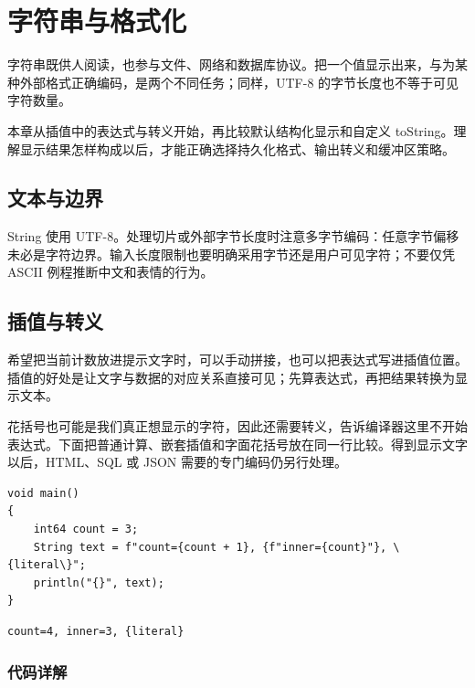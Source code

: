 \chapter{字符串与格式化}
\label{ch:12}

字符串既供人阅读，也参与文件、网络和数据库协议。把一个值显示出来，与为某种外部格式正确编码，是两个不同任务；同样，UTF-8 的字节长度也不等于可见字符数量。

本章从插值中的表达式与转义开始，再比较默认结构化显示和自定义 toString。理解显示结果怎样构成以后，才能正确选择持久化格式、输出转义和缓冲区策略。

\section{文本与边界}

String 使用 UTF-8。处理切片或外部字节长度时注意多字节编码：任意字节偏移未必是字符边界。输入长度限制也要明确采用字节还是用户可见字符；不要仅凭 ASCII 例程推断中文和表情的行为。

\section{插值与转义}

希望把当前计数放进提示文字时，可以手动拼接，也可以把表达式写进插值位置。插值的好处是让文字与数据的对应关系直接可见；先算表达式，再把结果转换为显示文本。

花括号也可能是我们真正想显示的字符，因此还需要转义，告诉编译器这里不开始表达式。下面把普通计算、嵌套插值和字面花括号放在同一行比较。得到显示文字以后，HTML、SQL 或 JSON 需要的专门编码仍另行处理。

\par
\medskip
\begin{lstlisting}[style=chali]
void main()
{
    int64 count = 3;
    String text = f"count={count + 1}, {f"inner={count}"}, \{literal\}";
    println("{}", text);
}
\end{lstlisting}
\par
\medskip

\par
\medskip
\begin{lstlisting}[style=out]
count=4, inner=3, {literal}
\end{lstlisting}
\par
\medskip

\subsection*{代码详解}

